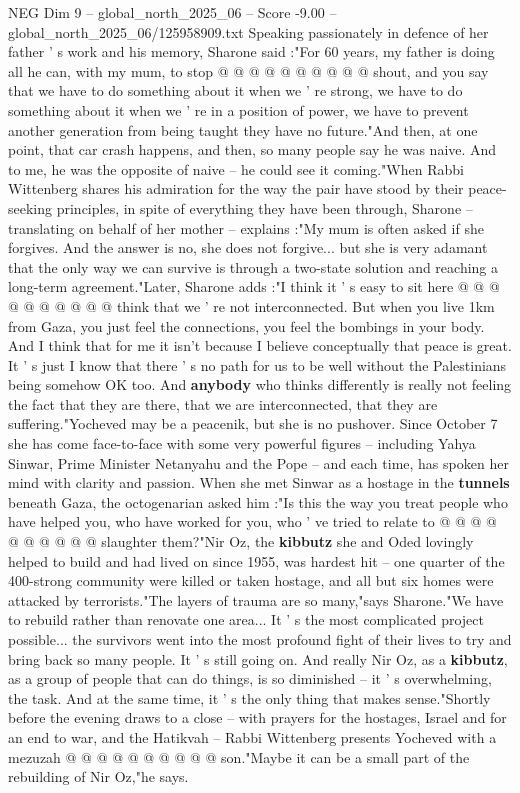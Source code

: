 \begin{textsample}{NEG Dim 9 – global\_north\_2025\_06 – Score -9.00 – global\_north\_2025\_06/125958909.txt}
Speaking passionately in defence of her father ' s work and his memory, Sharone said :"For 60 years, my father is doing all he can, with my mum, to stop @ @ @ @ @ @ @ @ @ @ shout, and you say that we have to do something about it when we ' re strong, we have to do something about it when we ' re in a position of power, we have to prevent another generation from being taught they have no future."And then, at one point, that car crash happens, and then, so many people say he was naive.
And to me, he was the opposite of naive -- he could see it coming."When Rabbi Wittenberg shares his admiration for the way the pair have stood by their peace-seeking principles, in spite of everything they have been through, Sharone -- translating on behalf of her mother -- explains :"My mum is often asked if she forgives.
And the answer is no, she does not forgive... but she is very adamant that the only way we can survive is through a two-state solution and reaching a long-term agreement."Later, Sharone adds :"I think it ' s easy to sit here @ @ @ @ @ @ @ @ @ @ think that we ' re not interconnected.
But when you live 1km from Gaza, you just feel the connections, you feel the bombings in your body.
And I think that for me it isn't because I believe conceptually that peace is great.
It ' s just I know that there ' s no path for us to be well without the Palestinians being somehow OK too.
And \textbf{anybody} who thinks differently is really not feeling the fact that they are there, that we are interconnected, that they are suffering."Yocheved may be a peacenik, but she is no pushover.
Since October 7 she has come face-to-face with some very powerful figures -- including Yahya Sinwar, Prime Minister Netanyahu and the Pope -- and each time, has spoken her mind with clarity and passion.
When she met Sinwar as a hostage in the \textbf{tunnels} beneath Gaza, the octogenarian asked him :"Is this the way you treat people who have helped you, who have worked for you, who ' ve tried to relate to @ @ @ @ @ @ @ @ @ @ slaughter them?"Nir Oz, the \textbf{kibbutz} she and Oded lovingly helped to build and had lived on since 1955, was hardest hit -- one quarter of the 400-strong community were killed or taken hostage, and all but six homes were attacked by terrorists."The layers of trauma are so many,"says Sharone."We have to rebuild rather than renovate one area...
It ' s the most complicated project possible... the survivors went into the most profound fight of their lives to try and bring back so many people.
It ' s still going on.
And really Nir Oz, as a \textbf{kibbutz}, as a group of people that can do things, is so diminished -- it ' s overwhelming, the task.
And at the same time, it ' s the only thing that makes sense."Shortly before the evening draws to a close -- with prayers for the hostages, Israel and for an end to war, and the Hatikvah -- Rabbi Wittenberg presents Yocheved with a mezuzah @ @ @ @ @ @ @ @ @ @ son."Maybe it can be a small part of the rebuilding of Nir Oz,"he says.

\end{textsample}
